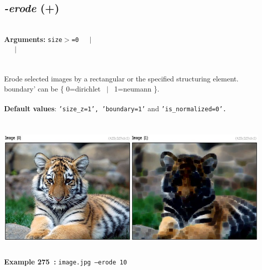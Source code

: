 \documentclass[a4paper,11pt,twoside]{book}
\begin{document}
\subsection{\emph{-erode} (+)}\vspace*{-0.5em}
~\\\textbf{Arguments: } 
{\small \texttt{size$>$=0}}~~~$|$\\
~~~$|$\\
\\~\\
Erode selected images by a rectangular or the specified structuring element.
boundary' can be \{ 0=dirichlet ~$|$~ 1=neumann \}.
~\\~\\\textbf{Default values}: {\small \texttt{'size\_z=1', 'boundary=1'} and \texttt{'is\_normalized=0'.}}
\begin{center}\includegraphics[keepaspectratio=true,height=7cm,width=\textwidth]{img/gmic_def275.jpg}\\
{\footnotesize \textbf{Example 275~:} \texttt{image.jpg --erode 10}}
\end{center}
\end{document}
